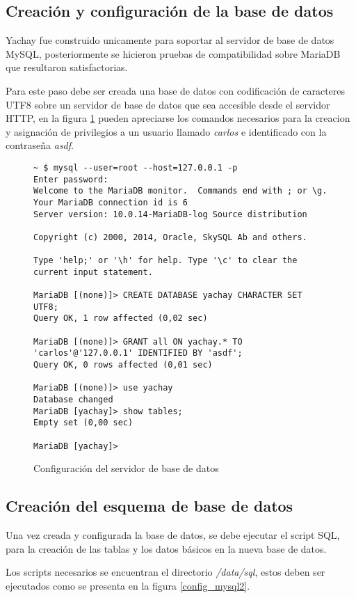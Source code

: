 \subsection{Creación y configuración de la base de datos}
Yachay fue construido unicamente para soportar al servidor de base de datos
MySQL, posteriormente se hicieron pruebas de compatibilidad sobre MariaDB que
resultaron satisfactorias.

Para este paso debe ser creada una base de datos con codificación de caracteres
UTF8 sobre un servidor de base de datos que sea accesible desde el servidor
HTTP, en la figura \ref{config_mysql1} pueden apreciarse los comandos necesarios
para la creacion y asignación de privilegios a un usuario llamado \emph{carlos}
e identificado con la contraseña \emph{asdf}.

\begin{figure}
\begin{verbatim}
~ $ mysql --user=root --host=127.0.0.1 -p
Enter password: 
Welcome to the MariaDB monitor.  Commands end with ; or \g.
Your MariaDB connection id is 6
Server version: 10.0.14-MariaDB-log Source distribution

Copyright (c) 2000, 2014, Oracle, SkySQL Ab and others.

Type 'help;' or '\h' for help. Type '\c' to clear the current input statement.

MariaDB [(none)]> CREATE DATABASE yachay CHARACTER SET UTF8;
Query OK, 1 row affected (0,02 sec)

MariaDB [(none)]> GRANT all ON yachay.* TO 'carlos'@'127.0.0.1' IDENTIFIED BY 'asdf';
Query OK, 0 rows affected (0,01 sec)

MariaDB [(none)]> use yachay
Database changed
MariaDB [yachay]> show tables;
Empty set (0,00 sec)

MariaDB [yachay]> 
\end{verbatim}
\caption{Configuración del servidor de base de datos}
\label{config_mysql1}
\end{figure}

\subsection{Creación del esquema de base de datos}
Una vez creada y configurada la base de datos, se debe ejecutar el script SQL,
para la creación de las tablas y los datos básicos en la nueva base de datos.

Los scripts necesarios se encuentran el directorio \emph{/data/sql}, estos deben
ser ejecutados como se presenta en la figura \ref{config_mysql2}.

